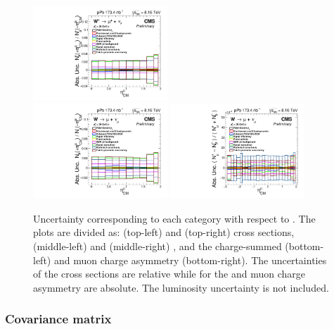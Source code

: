 \begin{figure}[!htbp]
 \includegraphics[width=0.45\textwidth]{Figures/WBoson/Analysis/Systematics/gr_WToMuPl_PA_ForwardBackward_Ratio_EffTnP.pdf}
\\
 \includegraphics[width=0.45\textwidth]{Figures/WBoson/Analysis/Systematics/gr_WToMuInc_PA_ForwardBackward_Ratio_EffTnP.pdf}
 \includegraphics[width=0.45\textwidth]{Figures/WBoson/Analysis/Systematics/gr_WToMuInc_PA_Charge_Asymmetry_EffTnP.pdf}
 \caption{Uncertainty corresponding to each category with respect to \etaCM. The plots are divided as: \WToMuNuMi (top-left) and \WToMuNuPl (top-right) cross sections, \WToMuNuMi (middle-left) and \WToMuNuPl (middle-right) \RFB, and the charge-summed \RFB (bottom-left) and muon charge asymmetry (bottom-right). The uncertainties of the cross sections are relative while for the \RFB and muon charge asymmetry are absolute. The luminosity uncertainty is not included.}
 \label{fig:Summary_Systematics}
\end{figure}


\subsubsection{Covariance matrix}\label{sec:WBoson_Analysis_Systematics_CovarianceMatrix}

